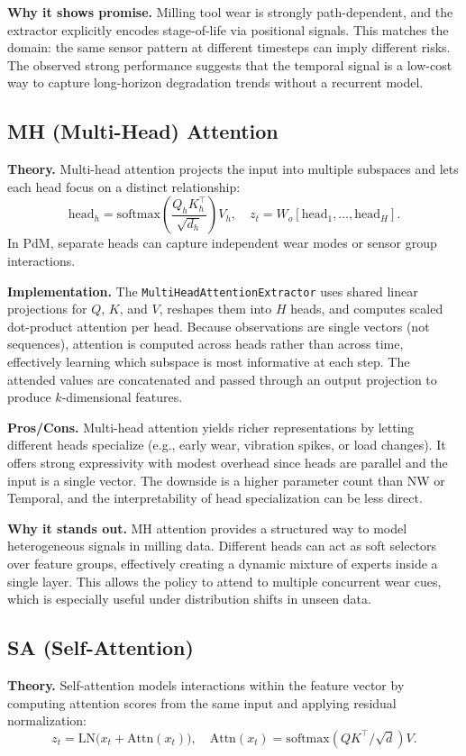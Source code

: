\documentclass[11pt]{article}
\begin{document}
\textbf{Why it shows promise.} Milling tool wear is strongly path-dependent, and the extractor explicitly encodes stage-of-life via positional signals. This matches the domain: the same sensor pattern at different timesteps can imply different risks. The observed strong performance suggests that the temporal signal is a low-cost way to capture long-horizon degradation trends without a recurrent model.

\subsection{MH (Multi-Head) Attention}
\textbf{Theory.} Multi-head attention projects the input into multiple subspaces and lets each head focus on a distinct relationship:
\begin{equation}
\text{head}_h = \text{softmax}\left(\frac{Q_h K_h^{\top}}{\sqrt{d_h}}\right)V_h,
\quad
z_t = W_o[\text{head}_1,\ldots,\text{head}_H].
\end{equation}
In PdM, separate heads can capture independent wear modes or sensor group interactions. \cite{Vaswani2017Attention}

\textbf{Implementation.} The \texttt{MultiHeadAttentionExtractor} uses shared linear projections for $Q$, $K$, and $V$, reshapes them into $H$ heads, and computes scaled dot-product attention per head. Because observations are single vectors (not sequences), attention is computed across heads rather than across time, effectively learning which subspace is most informative at each step. The attended values are concatenated and passed through an output projection to produce $k$-dimensional features.

\textbf{Pros/Cons.} Multi-head attention yields richer representations by letting different heads specialize (e.g., early wear, vibration spikes, or load changes). It offers strong expressivity with modest overhead since heads are parallel and the input is a single vector. The downside is a higher parameter count than NW or Temporal, and the interpretability of head specialization can be less direct.

\textbf{Why it stands out.} MH attention provides a structured way to model heterogeneous signals in milling data. Different heads can act as soft selectors over feature groups, effectively creating a dynamic mixture of experts inside a single layer. This allows the policy to attend to multiple concurrent wear cues, which is especially useful under distribution shifts in unseen data.

\subsection{SA (Self-Attention)}
\textbf{Theory.} Self-attention models interactions within the feature vector by computing attention scores from the same input and applying residual normalization:
\begin{equation}
z_t = \text{LN}\big(x_t + \text{Attn}(x_t)\big), \quad
\text{Attn}(x_t) = \text{softmax}(QK^{\top}/\sqrt{d})V.
\end{equation}
\end{document}
